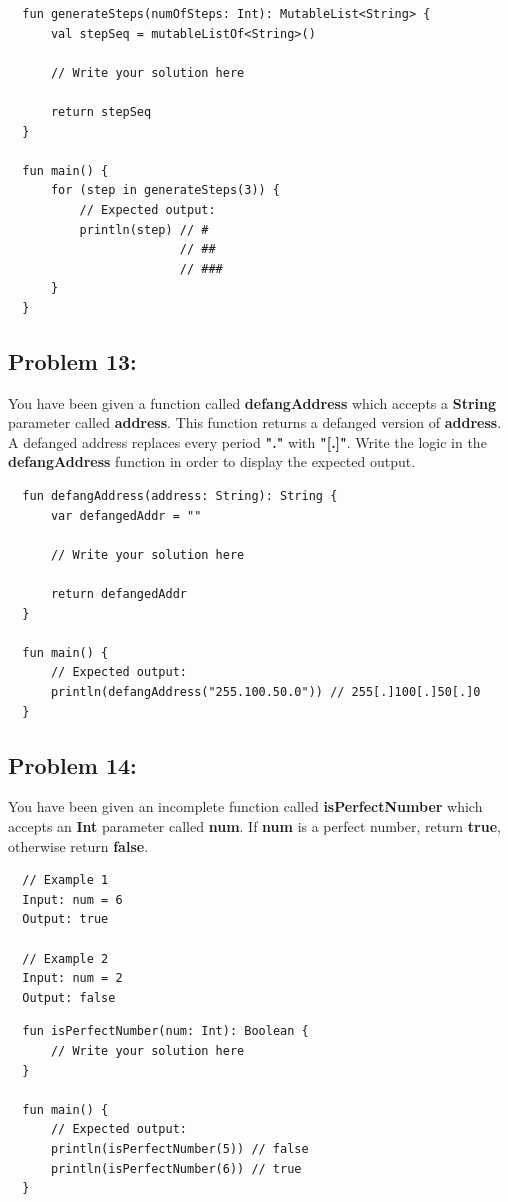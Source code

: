 \documentclass{article}
\begin{document}
\begin{verbatim}
  fun generateSteps(numOfSteps: Int): MutableList<String> {
      val stepSeq = mutableListOf<String>()

      // Write your solution here

      return stepSeq  
  }

  fun main() {
      for (step in generateSteps(3)) {
          // Expected output:
          println(step) // #  
                        // ## 
                        // ###
      }
  }
\end{verbatim}

\subsection*{Problem 13:}
You have been given a function called \textbf{defangAddress} which accepts a \textbf{String} parameter called \textbf{address}. This function returns a defanged version of \textbf{address}. A defanged address replaces every period \textbf{"."} with \textbf{"[.]"}. Write the logic in the \textbf{defangAddress} function in order to display the expected output.

\begin{verbatim}
  fun defangAddress(address: String): String {
      var defangedAddr = ""

      // Write your solution here

      return defangedAddr
  }

  fun main() {
      // Expected output:
      println(defangAddress("255.100.50.0")) // 255[.]100[.]50[.]0
  }
\end{verbatim}

\subsection*{Problem 14:}
You have been given an incomplete function called \textbf{isPerfectNumber} which accepts an \textbf{Int} parameter called \textbf{num}. If \textbf{num} is a perfect number, return \textbf{true}, otherwise return \textbf{false}.

\begin{verbatim}
  // Example 1
  Input: num = 6
  Output: true

  // Example 2
  Input: num = 2
  Output: false
\end{verbatim}

\begin{verbatim}
  fun isPerfectNumber(num: Int): Boolean {
      // Write your solution here
  }

  fun main() {
      // Expected output:
      println(isPerfectNumber(5)) // false
      println(isPerfectNumber(6)) // true
  }
\end{verbatim}
\end{document}
